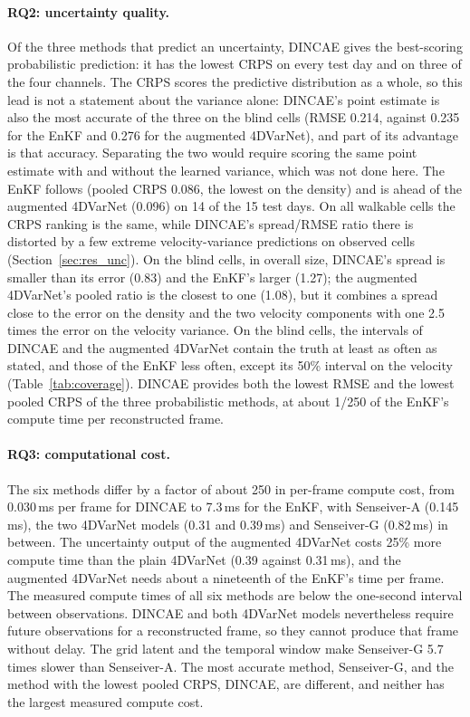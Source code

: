 \documentclass[english, 12pt, a4paper, elec, utf8, a-2b, online]{aaltothesis}
\begin{document}
\paragraph{RQ2: uncertainty quality.}
Of the three methods that predict an uncertainty, DINCAE gives the
best-scoring probabilistic prediction: it has the lowest CRPS on every test day
and on three of the four channels. The CRPS scores the predictive distribution
as a whole, so this lead is not a statement about the variance alone: DINCAE's
point estimate is also the most accurate of the three on the blind cells (RMSE
0.214, against 0.235 for the EnKF and 0.276 for the augmented 4DVarNet), and
part of its advantage is that accuracy. Separating the two would require
scoring the same point estimate with and without the learned variance, which
was not done here. The EnKF follows (pooled CRPS 0.086, the lowest on the
density) and is ahead of the augmented 4DVarNet (0.096) on 14 of the 15 test
days. On all walkable cells the CRPS ranking is the same, while DINCAE's
spread/RMSE ratio there is distorted by a few extreme velocity-variance
predictions on observed cells (Section~\ref{sec:res_unc}). On the blind cells, in overall size, DINCAE's spread is smaller than its error (0.83) and the
EnKF's larger (1.27); the augmented 4DVarNet's pooled ratio is the closest to
one (1.08), but it combines a spread close to the error on the density and the
two velocity components with one 2.5 times the error on the velocity variance.
On the blind cells, the intervals of DINCAE and the augmented 4DVarNet contain
the truth at least as often as stated, and those of the EnKF
less often, except its 50\% interval on the velocity
(Table~\ref{tab:coverage}).
DINCAE provides both the lowest RMSE and the lowest pooled CRPS of the three
probabilistic methods, at about 1/250 of the EnKF's
compute time per reconstructed frame.

\paragraph{RQ3: computational cost.}
The six methods differ by a factor of about 250 in per-frame compute cost, from
0.030\,ms per frame for DINCAE to 7.3\,ms for the EnKF, with Senseiver\nobreakdash-A
(0.145\,ms), the two 4DVarNet models (0.31 and 0.39\,ms) and Senseiver\nobreakdash-G
(0.82\,ms) in between. The uncertainty output of the augmented 4DVarNet costs
25\% more compute time than the plain 4DVarNet (0.39 against 0.31\,ms), and
the augmented 4DVarNet needs about a nineteenth of the EnKF's time per frame.
The measured compute times of all six methods are below the
one-second interval between observations. DINCAE and both 4DVarNet models
nevertheless require future observations for a reconstructed frame, so they
cannot produce that frame without delay. The grid latent and the
temporal window make Senseiver\nobreakdash-G 5.7 times slower than Senseiver\nobreakdash-A. The most accurate method,
Senseiver\nobreakdash-G, and the method with the lowest pooled CRPS, DINCAE, are different,
and neither has the largest measured compute cost.
\end{document}
